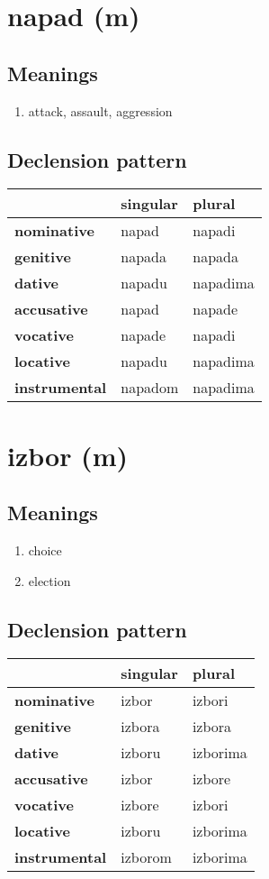 \filbreak
\section{napad (m)}
\subsection*{Meanings}
\begin{enumerate}
\item attack, assault, aggression
\end{enumerate}
\subsection*{Declension pattern}
\begin{tabularx}{\linewidth}{Xll}
\toprule
{} & singular &    plural \\
\midrule
\textbf{nominative  } &    napad &    napadi \\
\textbf{genitive    } &   napada &    napada \\
\textbf{dative      } &   napadu &  napadima \\
\textbf{accusative  } &    napad &    napade \\
\textbf{vocative    } &   napade &    napadi \\
\textbf{locative    } &   napadu &  napadima \\
\textbf{instrumental} &  napadom &  napadima \\
\bottomrule
\end{tabularx}

\filbreak
\section{izbor (m)}
\subsection*{Meanings}
\begin{enumerate}
\item choice
\item election
\end{enumerate}
\subsection*{Declension pattern}
\begin{tabularx}{\linewidth}{Xll}
\toprule
{} & singular &    plural \\
\midrule
\textbf{nominative  } &    izbor &    izbori \\
\textbf{genitive    } &   izbora &    izbora \\
\textbf{dative      } &   izboru &  izborima \\
\textbf{accusative  } &    izbor &    izbore \\
\textbf{vocative    } &   izbore &    izbori \\
\textbf{locative    } &   izboru &  izborima \\
\textbf{instrumental} &  izborom &  izborima \\
\bottomrule
\end{tabularx}

